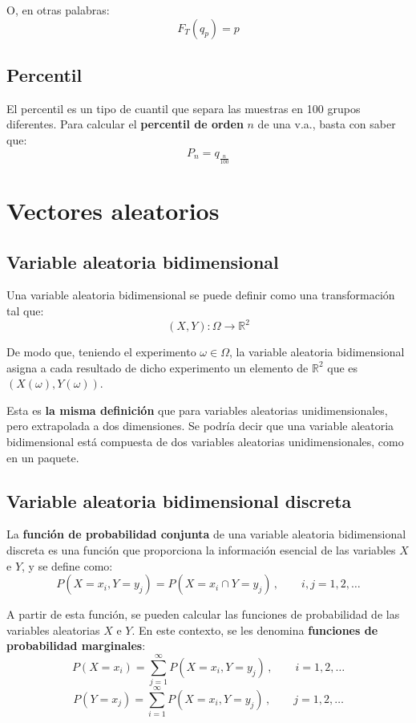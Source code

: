 \documentclass[a4paper]{book}
\begin{document}
O, en otras palabras: \[\boxed{F_T(q_p)=p}\]


\section{Percentil}
El percentil es un tipo de cuantil que separa las muestras en 100 grupos diferentes. Para calcular el \textbf{percentil de orden} $n$ de una v.a., basta con saber que: \[P_n = q_{\frac{n}{100}}\]


\chapter{Vectores aleatorios}
\section{Variable aleatoria bidimensional}

Una variable aleatoria bidimensional se puede definir como una transformación tal que:
\[\left( X,Y \right) : \Omega \longrightarrow \mathbb{R}^2\]

De modo que, teniendo el experimento $\omega \in \Omega$, la variable aleatoria bidimensional asigna a cada resultado de dicho experimento un elemento de $\mathbb{R}^2$ que es $\left( X(\omega ),Y(\omega )\right)$.

Esta es \textbf{la misma definición} que para variables aleatorias unidimensionales, pero extrapolada a dos dimensiones. Se podría decir que una variable aleatoria bidimensional está compuesta de dos variables aleatorias unidimensionales, como en un paquete.

\section{Variable aleatoria bidimensional discreta}

La \textbf{función de probabilidad conjunta} de una variable aleatoria bidimensional discreta es una función que proporciona la información esencial de las variables $X$ e $Y$, y se define como:
\[P\left( X=x_i,Y=y_j \right) = P\left( X=x_i \cap Y=y_j \right) \, , \qquad i, j = 1, 2, \dots \] 

A partir de esta función, se pueden calcular las funciones de probabilidad de las variables aleatorias $X$ e $Y$. En este contexto, se les denomina \textbf{funciones de probabilidad marginales}:
\[ P\left( X=x_i \right) = \sum_{j=1}^{\infty} P\left( X=x_i, Y=y_j \right) \, , \qquad i = 1, 2, \dots \]
\[ P\left( Y=x_j \right) = \sum_{i=1}^{\infty} P\left( X=x_i, Y=y_j \right) \, , \qquad j = 1, 2, \dots \]
\end{document}

